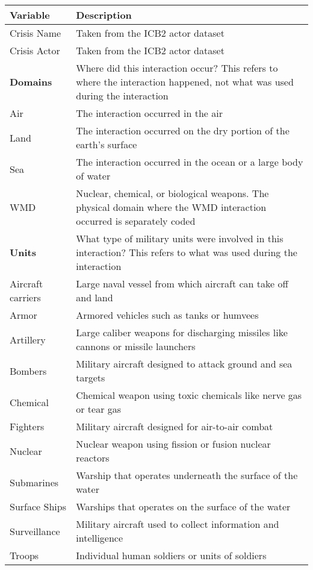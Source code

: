 \documentclass[12pt,letterpaper]{article}
\begin{document}
		\begin{table}[h]
			\centering
			\begin{tabular}{|l|p{14cm}|}
				\hline
				\textbf{Variable} & \textbf{Description} \\ 
				\hline
				\hline
				Crisis Name & Taken from the ICB2 actor dataset \\
				Crisis Actor & Taken from the ICB2 actor dataset \\
				\hline
				\textbf{Domains} & Where did this interaction occur? This refers to where the interaction happened, not what was used during the interaction \\
				Air &  The interaction occurred in the air \\
				Land & The interaction occurred on the dry portion of the earth's surface \\
				Sea & The interaction occurred in the ocean or a large body of water \\
				WMD & Nuclear, chemical, or biological weapons. The physical domain where the WMD interaction occurred is separately coded \\
				\hline
				\textbf{Units} & What type of military units were involved in this interaction? This refers to what was used during the interaction \\
				Aircraft carriers & Large naval vessel from which aircraft can take off and land \\
				Armor & Armored vehicles such as tanks or humvees \\
				Artillery & Large caliber weapons for discharging missiles like cannons or missile launchers \\
				Bombers & Military aircraft designed to attack ground and sea targets \\
				Chemical & Chemical weapon using toxic chemicals like nerve gas or tear gas \\
				Fighters & Military aircraft designed for air-to-air combat \\
				Nuclear & Nuclear weapon using fission or fusion nuclear reactors \\
				Submarines & Warship that operates underneath the surface of the water \\
				Surface Ships & Warships that operates on the surface of the water \\
				Surveillance & Military aircraft used to collect information and intelligence \\
				Troops & Individual human soldiers or units of soldiers \\
				\hline
			\end{tabular}
			\label{tab:variable_summary}
		\end{table}
\end{document}
